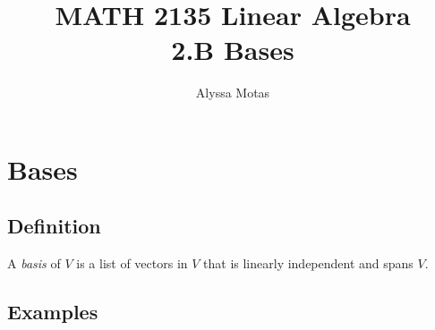 \documentclass[11pt]{article}
\title{\textbf{MATH 2135 Linear Algebra} \\ 2.B Bases}
\author{Alyssa Motas}
\begin{document}
    \maketitle

    \pagebreak

    \tableofcontents

    \pagebreak

    \section{Bases}

    \subsection{Definition}

    A \emph{basis} of $V$ is a list of vectors in $V$ that is linearly independent and spans $V$.

    \subsection{Examples}
\end{document}
